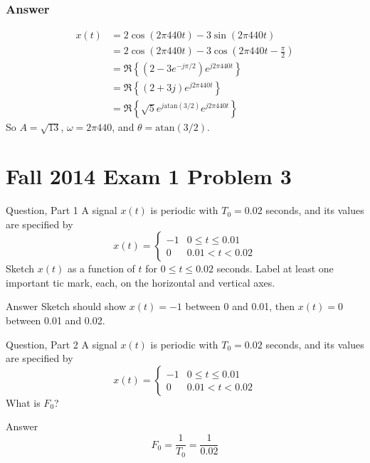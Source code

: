 \documentclass{beamer}
\begin{document}
\begin{frame}
  \frametitle{Answer}
  \begin{align*}
    x(t) &= 2\cos\left(2\pi 440t\right)-3\sin\left(2\pi 440t\right)\\
    &= 2\cos\left(2\pi 440t\right)-3\cos\left(2\pi 440t-\frac{\pi}{2}\right)\\
    &= \Re\left\{(2-3e^{-j\pi/2})e^{j2\pi 440t}\right\}\\
    &= \Re\left\{(2+3j)e^{j2\pi 440t}\right\}\\
    &= \Re\left\{\sqrt{5}e^{j\mbox{atan}(3/2)}e^{j2\pi 440t}\right\}
  \end{align*}
  So $A=\sqrt{13}$, $\omega=2\pi 440$, and $\theta=\mbox{atan}(3/2)$.
\end{frame}

\section[14x1p3]{Fall 2014 Exam 1 Problem 3}
\setcounter{subsection}{1}

\begin{frame}
  \begin{block}{Question, Part 1}
  A signal $x(t)$ is periodic with $T_0=0.02$ seconds, and its values
  are specified by
  \[
  x(t)=\left\{\begin{array}{ll}
  -1 & 0\le t\le 0.01\\
  0 & 0.01<t<0.02
  \end{array}\right.
  \]
  Sketch $x(t)$ as a function of $t$ for $0\le t\le 0.02$ seconds.
  Label at least one important tic mark, each, on the horizontal and
  vertical axes.
  \end{block}
  \begin{block}{Answer}
    Sketch should show $x(t)=-1$ between 0 and 0.01, then $x(t)=0$ between 0.01 and 0.02.
  \end{block}
\end{frame}

\begin{frame}
  \begin{block}{Question, Part 2}
    A signal $x(t)$ is periodic with $T_0=0.02$ seconds, and its values
    are specified by
    \[
    x(t)=\left\{\begin{array}{ll}
    -1 & 0\le t\le 0.01\\
    0 & 0.01<t<0.02
    \end{array}\right.
    \]
    What is $F_0$?
  \end{block}
  \begin{block}{Answer}
    \[
    F_0 = \frac{1}{T_0} = \frac{1}{0.02}
    \]
  \end{block}
\end{frame}
\end{document}
